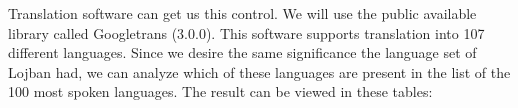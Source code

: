 Translation software can get us this control. We will use the public available library called Googletrans (3.0.0). This software supports translation into 107 different languages. Since we desire the same significance the language set of Lojban had, we can analyze which of these languages are present in the list of the 100 most spoken languages. The result can be viewed in these tables: 

\setcounter{tablecount}{1}

